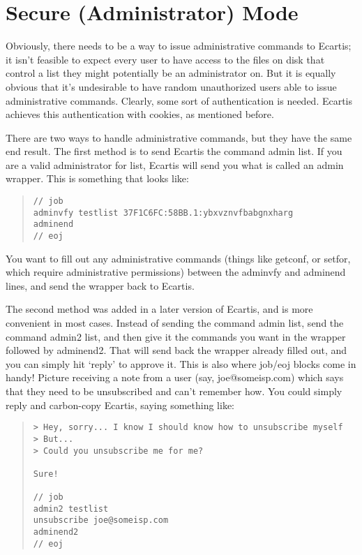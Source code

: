\documentclass{book}
\begin{document}
\section{Secure (Administrator) Mode}
\label{interface:admin}

Obviously, there needs to be a way to issue administrative commands to
Ecartis; it isn't feasible to expect every user to have access to the files on
disk that control a list they might potentially be an administrator on.  But
it is equally obvious that it's undesirable to have random unauthorized users
able to issue administrative commands.  Clearly, some sort of authentication
is needed.  Ecartis achieves this authentication with cookies, as mentioned
before.
   
There are two ways to handle administrative commands, but they have the same
end result.  The first method is to send Ecartis the command admin list.  If
you are a valid administrator for list, Ecartis will send you what is called
an admin wrapper.  This is something that looks like:
   
\begin{quote}
\footnotesize
\begin{verbatim}
// job
adminvfy testlist 37F1C6FC:58BB.1:ybxvznvfbabgnxharg
adminend
// eoj
\end{verbatim}
\end{quote}
   
You want to fill out any administrative commands (things like getconf, or
setfor, which require administrative permissions) between the adminvfy and
adminend lines, and send the wrapper back to Ecartis.
   
The second method was added in a later version of Ecartis, and is more
convenient in most cases.  Instead of sending the command admin list, send the
command admin2 list, and then give it the commands you want in the wrapper
followed by adminend2.  That will send back the wrapper already filled out,
and you can simply hit `reply' to approve it.  This is also where job/eoj
blocks come in handy!  Picture receiving a note from a user (say,
joe@someisp.com) which says that they need to be unsubscribed and can't
remember how.  You could simply reply and carbon-copy Ecartis, saying
something like:
   
\begin{quote}   
\footnotesize
\begin{verbatim}
> Hey, sorry... I know I should know how to unsubscribe myself
> But...
> Could you unsubscribe me for me?

Sure!

// job
admin2 testlist
unsubscribe joe@someisp.com
adminend2
// eoj
\end{verbatim} 
\end{quote}
   
\end{document}
